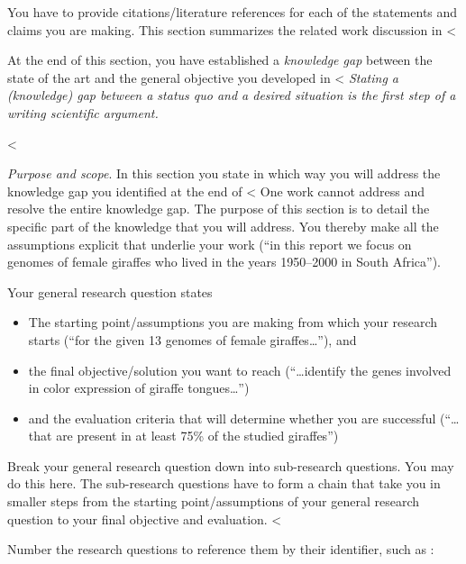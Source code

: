 {{{You have to provide citations/literature references for each of the statements and claims you are making.
This section summarizes the related work discussion in <%

At the end of this section, you have established a \emph{knowledge gap} between the state of the art and the general objective you developed in <%
\emph{Stating a (knowledge) gap between a status quo and a desired situation is the \emph{first step} of a writing scientific argument.}

<%

\emph{Purpose and scope}.
In this section you state in which way you will address the knowledge gap you identified at the end of <%
One work cannot address and resolve the entire knowledge gap.
The purpose of this section is to detail the specific part of the knowledge that you will address.
You thereby make all the assumptions explicit that underlie your work (``in this report we focus on genomes of female giraffes who lived in the years 1950--2000 in South Africa'').

Your general research question states
\begin{itemize}
  \item The starting point/assumptions you are making from which your research starts (``for the given 13 genomes of female giraffes\ldots''), and
  \item the final objective/solution you want to reach (``\ldots{}identify the genes involved in color expression of giraffe tongues\ldots'')
  \item and the evaluation criteria that will determine whether you are successful (``\ldots{}that are present in at least 75\% of the studied giraffes'')
\end{itemize}

Break your general research question down into sub-research questions.
You may do this here.
The sub-research questions have to form a chain that take you in smaller steps from the starting point/assumptions of your general research question to your final objective and evaluation.
<%

Number the research questions to reference them by their identifier, such as :

}}}

